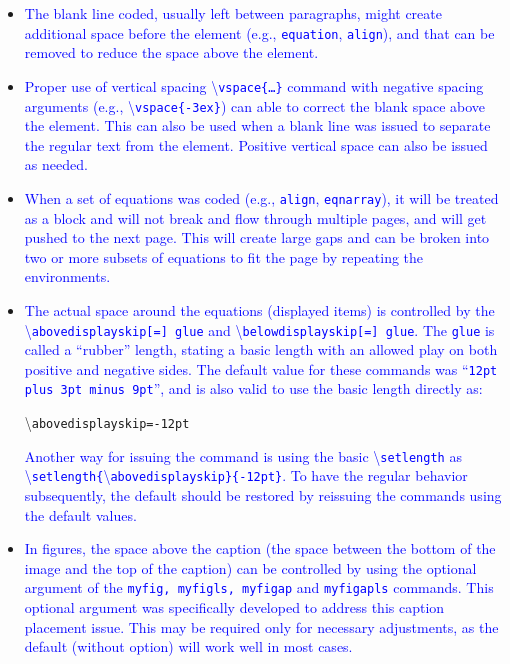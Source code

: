 \documentclass[phd,showframe]{ndsu-thesis-2022}
\newcommand\italk[1]{\textcolor{blue}{#1}}  %
\newcommand\cmd[1]{\textbackslash\texttt{#1}}  %
\begin{document}
\begin{itemize}
\item
\italk{The blank line coded, usually left between paragraphs, might create additional space before the element (e.g., \texttt{equation}, \texttt{align}), and that can be removed to reduce the space above the element.}
\item
\italk{Proper use of vertical spacing \cmd{vspace\{\ldots\}} command with negative spacing arguments (e.g., \cmd{vspace\{-3ex\}}) can able to correct the blank space above the element. This can also be used when a blank line was issued to separate the regular text from the element. Positive vertical space can also be issued as needed.}
\item
\italk{When a set of equations was coded (e.g., \texttt{align}, \texttt{eqnarray}), it will be treated as a block and will not break and flow through multiple pages, and will get pushed to the next page. This will create large gaps and can be broken into two or more subsets of equations to fit the page by repeating the environments.}
\item
\italk{The actual space around the equations (displayed items) is controlled by the \\ \cmd{abovedisplayskip[=] glue} and \cmd{belowdisplayskip[=] glue}.
The \texttt{glue} is called a ``rubber'' length, stating a basic length with an allowed play on both positive and negative sides. The default value for these commands was ``\texttt{12pt plus 3pt minus 9pt}'', and is also valid to use the basic length directly as:} 

\cmd{abovedisplayskip=-12pt}

\italk{Another way for issuing the command is using the basic \cmd{setlength} as \\ \cmd{setlength\{}\cmd{abovedisplayskip\}\{-12pt\}}. To have the regular behavior subsequently, the default should be restored by reissuing the commands using the default values.}
\item
\italk{In figures, the space above the caption (the space between the bottom of the image and the top of the caption) can be controlled by using the optional argument of the \texttt{myfig, myfigls, myfigap} and \texttt{myfigapls} commands. This optional argument was specifically developed to address this caption placement issue. This may be required only for necessary adjustments, as the default (without option) will work well in most cases.}
\end{itemize}

\end{document}
